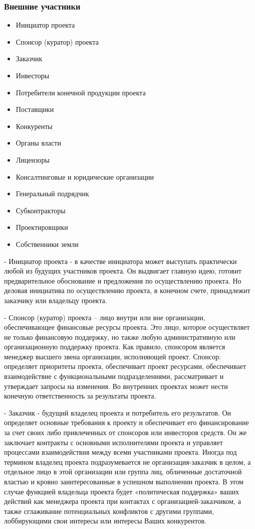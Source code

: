 \documentclass{../industrial-development}
\begin{document}
\begin{frame} \frametitle{Внешние участники}
	\begin{itemize}
		\item Инициатор проекта
		\item Спонсор (куратор) проекта
		\item Заказчик
		\item Инвесторы
		\item Потребители конечной продукции проекта
		\item Поставщики
		\item Конкуренты
		\item Органы власти
		\item Лицензоры
		\item Консалтинговые и юридические организации 
		\item Генеральный подрядчик
		\item Субконтракторы
		\item Проектировщики
		\item Собственники земли
	\end{itemize}
\end{frame}

\lecturenotes
- Инициатор проекта - в качестве инициатора может выступать практически любой из будущих участников проекта. Он выдвигает главную идею, готовит предварительное обоснование и предложения по осуществлению проекта. Но деловая инициатива по осуществлению проекта, в конечном счете, принадлежит заказчику или владельцу проекта.

- Спонсор (куратор) проекта – лицо внутри или вне организации, обеспечивающее финансовые ресурсы проекта. Это лицо, которое осуществляет не только финансовую поддержку, но также любую административную или организационную поддержку проекта. Как правило, спонсором является менеджер высшего звена организации, исполняющей проект. Спонсор: определяет приоритеты проекта, обеспечивает проект ресурсами, обеспечивает взаимодействие с функциональными подразделениями, рассматривает и утверждает запросы на изменения. Во внутренних проектах может нести конечную ответственность за результаты проекта.

- Заказчик - будущий владелец проекта и потребитель его результатов. Он определяет основные требования к проекту и обеспечивает его финансирование за счет своих либо привлеченных от спонсоров или инвесторов средств. Он же заключает контракты с основными исполнителями проекта и управляет процессами взаимодействия между всеми участниками проекта. Иногда под термином владелец проекта подразумевается не организация-заказчик в целом, а отдельное лицо в этой организации или группа лиц, обличенные достаточной властью и кровно заинтересованные в успешном выполнении проекта. В этом случае функцией владельца проекта будет «политическая поддержка» ваших действий как менеджера проекта при контактах с организацией-заказчиком, а также сглаживание потенциальных конфликтов с другими группами, лоббирующими свои интересы или интересы Ваших конкурентов.
\end{document}
